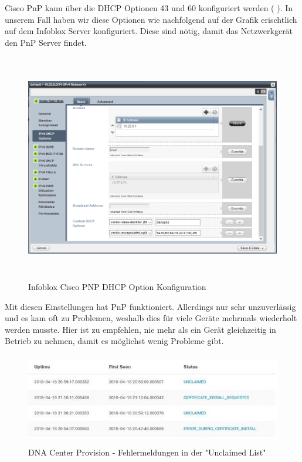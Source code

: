 Cisco PnP kann über die DHCP Optionen 43 und 60 konfiguriert werden ( \cite{cisco-pnp-dhcp}). In unserem Fall haben wir diese Optionen wie nachfolgend auf der Grafik erischtlich auf dem Infoblox Server konfiguriert. Diese sind nötig, damit das Netzwerkgerät den PnP Server findet.

\begin{figure}[H]
	\centering
	\includegraphics[height=10cm]{img/Infoblox_PNP.png}
	\caption{Infoblox Cisco PNP DHCP Option Konfiguration}
	\label{fig:cisco-pnp}
\end{figure}

Mit diesen Einstellungen hat PnP funktioniert. Allerdings nur sehr unzuverlässig und es kam oft zu Problemen, weshalb dies für viele Geräte mehrmals wiederholt werden musste. Hier ist zu empfehlen, nie mehr als ein Gerät gleichzeitig in Betrieb zu nehmen, damit es möglichst wenig Probleme gibt.

\begin{figure}[H]
	\centering
	\includegraphics[height=4cm]{img/DNA_Center_Unclaimed_Errors_1.PNG}
	\caption{DNA Center Provision - Fehlermeldungen in der "Unclaimed List"}
	\label{fig:dna-center-provision-unclaimed-2}
\end{figure}
